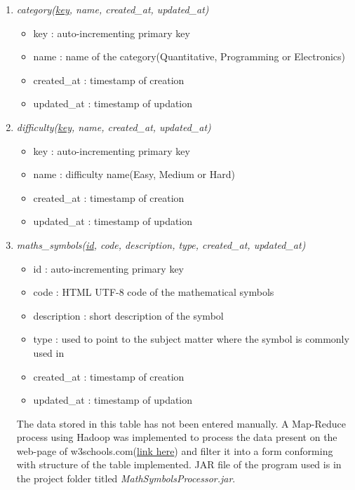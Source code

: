 \documentclass[a4paper,12pt,oneside]{book}
\begin{document}
\begin{enumerate}
            \item \textit{category(\underline{key}, name, created\_at, updated\_at)}
                \begin{itemize}
                  \item key : auto-incrementing primary key
                  \item name : name of the category(Quantitative, Programming or Electronics)
                  \item created\_at : timestamp of creation
                  \item updated\_at : timestamp of updation 
                \end{itemize}
                
            \item \textit{difficulty(\underline{key}, name, created\_at, updated\_at)}
                \begin{itemize}
                  \item key : auto-incrementing primary key
                  \item name : difficulty name(Easy, Medium or Hard)
                  \item created\_at : timestamp of creation
                  \item updated\_at : timestamp of updation 
                \end{itemize}
                
            \item \textit{maths\_symbols(\underline{id}, code, description, type, created\_at, updated\_at)}
                \begin{itemize}
                  \item id : auto-incrementing primary key
                  \item code : HTML UTF-8 code of the mathematical symbols
                  \item description : short description of the symbol 
                  \item type : used to point to the subject matter where the symbol is commonly used in 
                  \item created\_at : timestamp of creation
                  \item updated\_at : timestamp of updation 
                \end{itemize}
                The data stored in this table has not been entered manually. A Map-Reduce process using Hadoop was implemented to process the data present on the web-page of w3schools.com({\href{http://www.w3schools.com/charsets/ref_utf_math.asp}{link here}}) and filter it into a form conforming with structure of the table implemented. JAR file of the program used is in the project folder titled \textit{MathSymbolsProcessor.jar}.
                

\end{enumerate}
\end{document}
